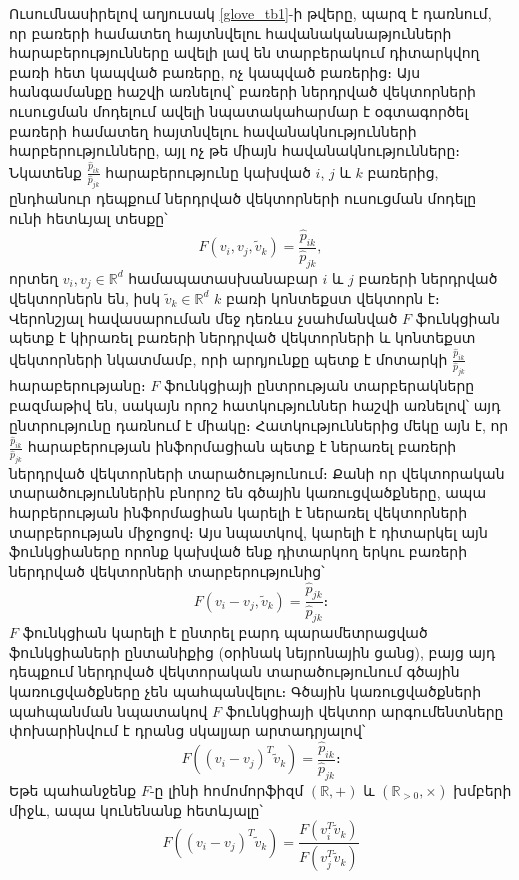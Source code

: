 \documentclass[11pt]{article}
\begin{document}
Ուսումնասիրելով աղյուսակ \ref{glove_tb1}-ի թվերը, պարզ է դառնում, որ բառերի համատեղ հայտնվելու հավանականաթյունների հարաբերությունները  ավելի լավ են տարբերակում դիտարկվող բառի հետ կապված բառերը, ոչ կապված բառերից։  Այս հանգամանքը հաշվի առնելով՝ բառերի ներդրված վեկտորների ուսուցման մոդելում ավելի նպատակահարմար է օգտագործել բառերի համատեղ հայտնվելու հավանակնությունների հարբերությունները, այլ ոչ թե միայն հավանակնությունները։ Նկատենք $\frac{\hat p_{ik}}{\hat p_{jk}}$ հարաբերությունը կախված $i$, $j$ և $k$ բառերից, ընդհանուր դեպքում ներդրված վեկտորների ուսուցման մոդելը ունի հետևյալ տեսքը՝ 
\begin{equation}
F(v_{i}, v_{j}, \widetilde{v}_k) = \frac{\hat p_{ik}}{\hat p_{jk}},
\label{glove_first_eq}
\end{equation}
որտեղ  	$v_i, v_j \in \mathbb{R}^d$ համապատասխանաբար $i$ և $j$ բառերի ներդրված վեկտորներն են, իսկ $\widetilde{v}_k \in \mathbb{R}^d$ $k$ բառի կոնտեքստ վեկտորն է։  Վերոնշյալ հավասարուման մեջ դեռևս չսահմանված $F$ ֆունկցիան պետք է կիրառել բառերի ներդրված վեկտորների և կոնտեքստ վեկտորների նկատմամբ, որի արդյունքը պետք է մոտարկի $\frac{\hat p_{ik}}{\hat p_{jk}}$ հարաբերությանը։ 
$F$ ֆունկցիայի ընտրության տարբերակները բազմաթիվ են, սակայն որոշ հատկություններ հաշվի առնելով՝ այդ ընտրությունը դառնում է միակը։ Հատկություններից մեկը այն է, որ $\frac{\hat p_{ik}}{\hat p_{jk}}$ հարաբերության ինֆորմացիան պետք է ներառել բառերի ներդրված վեկտորների տարածությունում։ Քանի որ վեկտորական տարածություններին բնորոշ են գծային կառուցվածքները, ապա հարբերության ինֆորմացիան կարելի է  ներառել վեկտորների տարբերության միջոցով։ Այս նպատկով, կարելի է դիտարկել այն ֆունկցիաները որոնք կախված ենք դիտարկող երկու բառերի ներդրված վեկտորների տարբերությունից՝
\begin{equation}
F(v_i-v_j, \widetilde{v}_k) = \frac{\hat p_{jk}} {\hat p_{jk}}։
\end{equation}
 $F$ ֆունկցիան կարելի է ընտրել բարդ պարամետրացված ֆունկցիաների ընտանիքից (օրինակ նեյրոնային ցանց), բայց այդ դեպքում ներդրված վեկտորական տարածությունում գծային կառուցվածքները չեն պահպանվելու։ Գծային կառուցվածքների պահպանման նպատակով $F$ ֆունկցիայի վեկտոր արգումենտները փոխարինվում է դրանց սկալյար արտադրյալով՝
 $$F((v_i-v_j)^T \widetilde{v}_k) = \frac{\hat p_{ik}}{\hat p_{jk}}։$$
 Եթե պահանջենք $F$-ը լինի հոմոմորֆիզմ $\left ( \mathbb{R}, + \right )$ և $\left (\mathbb{R}_{>0}, \times  \right )$ խմբերի միջև, ապա կունենանք հետևյալը՝
  \begin{equation}
 F((v_i - v_j)^T \widetilde{v}_k) = \frac{F(v_i^T\widetilde{v}_k)}{F(v_j^T\widetilde{v}_k)} 
  \end{equation}
\end{document}
